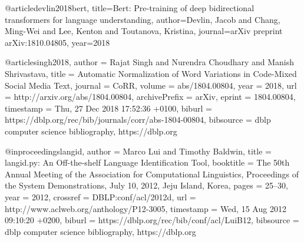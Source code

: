 

@article{devlin2018bert,
  title={Bert: Pre-training of deep bidirectional transformers for language understanding},
  author={Devlin, Jacob and Chang, Ming-Wei and Lee, Kenton and Toutanova, Kristina},
  journal={arXiv preprint arXiv:1810.04805},
  year={2018}
}

@article{singh2018,
  author    = {Rajat Singh and
               Nurendra Choudhary and
               Manish Shrivastava},
  title     = {Automatic Normalization of Word Variations in Code-Mixed Social Media
               Text},
  journal   = {CoRR},
  volume    = {abs/1804.00804},
  year      = {2018},
  url       = {http://arxiv.org/abs/1804.00804},
  archivePrefix = {arXiv},
  eprint    = {1804.00804},
  timestamp = {Thu, 27 Dec 2018 17:52:36 +0100},
  biburl    = {https://dblp.org/rec/bib/journals/corr/abs-1804-00804},
  bibsource = {dblp computer science bibliography, https://dblp.org}
}

@inproceedings{langid,
  author    = {Marco Lui and
               Timothy Baldwin},
  title     = {langid.py: An Off-the-shelf Language Identification Tool},
  booktitle = {The 50th Annual Meeting of the Association for Computational Linguistics,
               Proceedings of the System Demonstrations, July 10, 2012, Jeju Island,
               Korea},
  pages     = {25--30},
  year      = {2012},
  crossref  = {DBLP:conf/acl/2012d},
  url       = {http://www.aclweb.org/anthology/P12-3005},
  timestamp = {Wed, 15 Aug 2012 09:10:20 +0200},
  biburl    = {https://dblp.org/rec/bib/conf/acl/LuiB12},
  bibsource = {dblp computer science bibliography, https://dblp.org}
}
